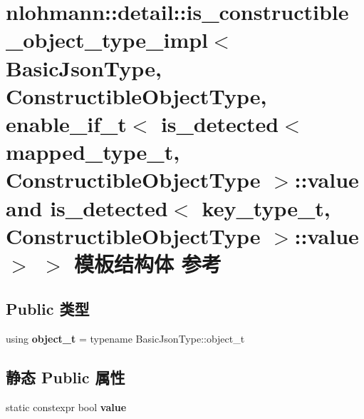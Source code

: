 \hypertarget{structnlohmann_1_1detail_1_1is__constructible__object__type__impl_3_01_basic_json_type_00_01_con6e3270de8050717120afcafe87648413}{}\section{nlohmann\+::detail\+::is\+\_\+constructible\+\_\+object\+\_\+type\+\_\+impl$<$ Basic\+Json\+Type, Constructible\+Object\+Type, enable\+\_\+if\+\_\+t$<$ is\+\_\+detected$<$ mapped\+\_\+type\+\_\+t, Constructible\+Object\+Type $>$\+::value and is\+\_\+detected$<$ key\+\_\+type\+\_\+t, Constructible\+Object\+Type $>$\+::value $>$ $>$ 模板结构体 参考}
\label{structnlohmann_1_1detail_1_1is__constructible__object__type__impl_3_01_basic_json_type_00_01_con6e3270de8050717120afcafe87648413}
\subsection*{Public 类型}
\begin{DoxyCompactItemize}
\item 
\mbox{\label{structnlohmann_1_1detail_1_1is__constructible__object__type__impl_3_01_basic_json_type_00_01_con6e3270de8050717120afcafe87648413_a6f458a63276ef62d60f4b93de03aa020}} 
using {\bfseries object\+\_\+t} = typename Basic\+Json\+Type\+::object\+\_\+t
\end{DoxyCompactItemize}
\subsection*{静态 Public 属性}
\begin{DoxyCompactItemize}
\item 
static constexpr bool {\bfseries value}
\end{DoxyCompactItemize}


